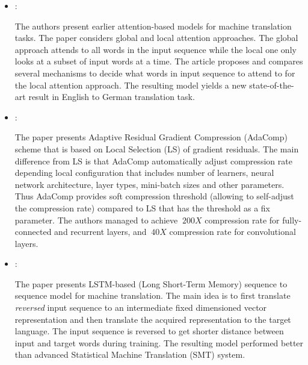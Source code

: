 \begin{itemize}
    \item \cite{Luong:AttentionNMT:2015}:

    The authors present earlier attention-based models for machine translation tasks. The paper considers global and local attention approaches. The global approach attends to all words in the input sequence while the local one only looks at a subset of input words at a time. The article proposes and compares several mechanisms to decide what words in input sequence to attend to for the local attention approach. The resulting model yields a new state-of-the-art result in English to German translation task.

    \item \cite{Chen:AdaComp:2018}:

    The paper presents Adaptive Residual Gradient Compression (AdaComp) scheme that is based on Local Selection (LS) of gradient residuals. The main difference from LS is that AdaComp automatically adjust compression rate depending local configuration that includes number of learners, neural network architecture, layer types, mini-batch sizes and other parameters. Thus AdaComp provides soft compression threshold (allowing to self-adjust the compression rate) compared to LS that has the threshold as a fix parameter. The authors managed to achieve $~200X$ compression rate for fully-connected and recurrent layers, and $~40X$ compression rate for convolutional layers.

    \item \cite{Sutskever:Seq2seq:2014}:

    The paper presents LSTM-based (Long Short-Term Memory) sequence to sequence model for machine translation. The main idea is to first translate \textit{reversed} input sequence to an intermediate fixed dimensioned vector representation and then translate the acquired representation to the target language. The input sequence is reversed to get shorter distance between input and target words during training. The resulting model performed better than advanced Statistical Machine Translation (SMT) system.
\end{itemize}

